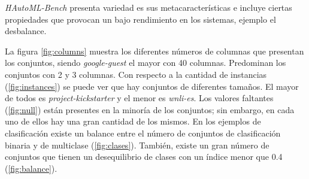 \textit{HAutoML-Bench} presenta variedad es sus metacaracterísticas e incluye ciertas propiedades que provocan 
un bajo rendimiento en los sistemas, ejemplo el desbalance.

La figura \ref{fig:columns} muestra los diferentes números de columnas que presentan los conjuntos, siendo \textit{google-guest} el mayor con 40 columnas. 
Predominan los conjuntos con 2 y 3 columnas. 
Con respecto a la cantidad de instancias (\ref{fig:instances}) se puede ver que hay conjuntos de diferentes tamaños.
El mayor de todos es \textit{project-kickstarter} y el menor es \textit{wnli-es}.
Los valores faltantes (\ref{fig:null}) están presentes en la minoría de los conjuntos; sin embargo, en cada uno de ellos hay una 
gran cantidad de los mismos. 
En los ejemplos de clasificación existe un balance entre el número de conjuntos de clasificación binaria y de multiclase (\ref{fig:clases}). 
También, existe un gran número de conjuntos que tienen un desequilibrio de clases con un índice menor que 0.4 (\ref{fig:balance}).


